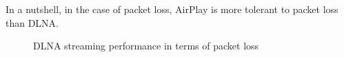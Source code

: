 In a nutshell, in the case of packet loss, AirPlay is more tolerant to packet loss than DLNA.
\begin{figure}[hb]
\caption{DLNA streaming performance in terms of packet loss \label{dlna_pl}}
\end{figure}

